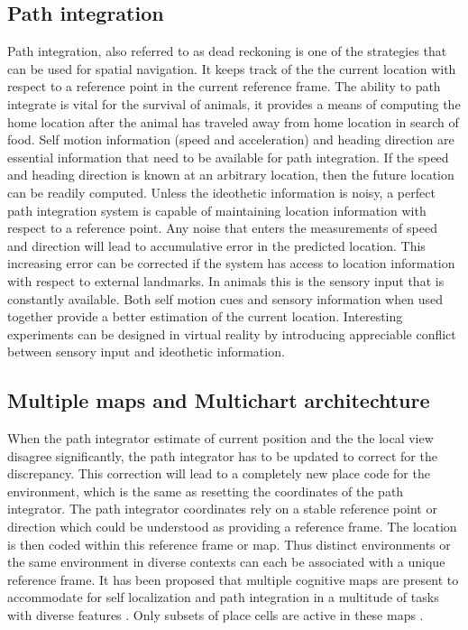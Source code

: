 \subsection{Path integration}
\label{pathIntgr}
Path integration, also referred to as dead reckoning is one of the strategies that can be used for spatial navigation. It keeps track of the the current location with respect to a reference point in the current reference frame. The ability to path integrate is vital for the survival of animals, it provides a means of computing the home location after the animal has traveled away from home location in search of food.
Self motion information (speed and acceleration) and heading direction are essential information that need to be available for path integration. If the speed and heading direction is known at an arbitrary location, then the future location can be readily computed. Unless the ideothetic information is noisy, a perfect path integration system is capable of maintaining location information with respect to a reference point. Any noise that enters the measurements of speed and direction will lead to accumulative error in the predicted location. This increasing error can be corrected if the system has access to location information with respect to external landmarks. In animals this is the sensory input that is constantly available. Both self motion cues and sensory information when used together provide a better estimation of the current location. Interesting experiments can be designed in virtual reality by introducing appreciable conflict between sensory input and ideothetic information. 

\subsection{Multiple maps and Multichart architechture}
\label{multichart}
When the path integrator estimate of current position and the the local view disagree significantly, the path integrator has to be updated to correct for the discrepancy. This correction will lead to a completely new place code for the environment, which is the same as resetting the coordinates of the path integrator. The path integrator coordinates rely on a stable reference point or direction which could be understood as providing a reference frame. The location is then coded within this reference frame or map. Thus distinct environments or the same environment in diverse contexts can each be associated with a unique reference frame. It has been proposed that multiple cognitive maps are present to accommodate for self localization and path integration in a multitude of tasks with diverse features \cite{Street}. Only subsets of place cells are active in these maps \cite{Muller1987}.\\
 
